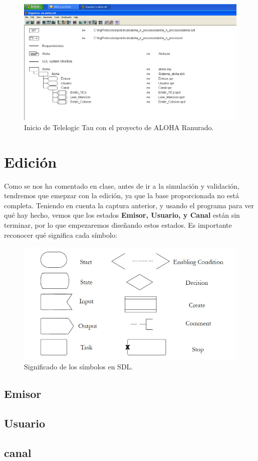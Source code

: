 \documentclass{article}
\begin{document}
\quad

\begin{figure}[h]
    \centering
    \includegraphics[width=1\linewidth]{src/Organizer-tltau.png}
    \caption{\label{fig:tltau} Inicio de Telelogic Tau con el proyecto de ALOHA Ranurado.}
\end{figure}

\newpage

\section{Edición}

Como se nos ha comentado en clase, antes de ir a la simulación y validación, tendremos que emepzar con la edición, ya que la base proporcionada no está completa. Teniendo en cuenta la captura anterior, y usando el programa para ver qué hay hecho, vemos que los estados \textbf{Emisor, Usuario, y Canal} están sin terminar, por lo que empezaremos diseñando estos estados.
Es importante reconocer qué significa cada símbolo:

\begin{figure}[h]
    \centering
    \includegraphics[width=0.7\linewidth]{src/sdl-symbols.jpg}
    \caption{\label{fig:sdlsymbols} Significado de los símbolos en SDL.}
\end{figure}

\quad

\subsection{Emisor}

\subsection{Usuario}

\subsection{canal}
\end{document}

